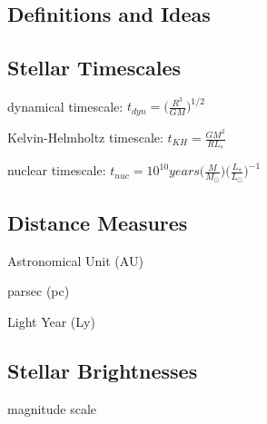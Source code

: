 \documentclass[a4paper, 11pt, landscape]{article}
\begin{document}
\begin{multicols*}{3}

\section{Definitions and Ideas}
\subsection{Stellar Timescales}
\begin{compactenum}
	\item dynamical timescale: $t_{dyn} = \Big( \frac{R^{3}}{GM} \Big)^{1/2}$
	\item Kelvin-Helmholtz timescale: $t_{KH} = \frac{GM^{2}}{RL_{s}}$
	\item nuclear timescale: $t_{nuc} = 10^{10} years \Big( \frac{M}{M_{\odot}}\Big)\Big(\frac{L_{s}}{L_{\odot}}\Big)^{-1}$
\end{compactenum}

\subsection{Distance Measures}
\begin{compactenum}
	\item Astronomical Unit (AU)
	\item parsec (pc)
	\item Light Year (Ly)
\end{compactenum}

\subsection{Stellar Brightnesses}
\begin{compactenum}
	\item magnitude scale
\end{compactenum}


\end{multicols*}
\end{document}
